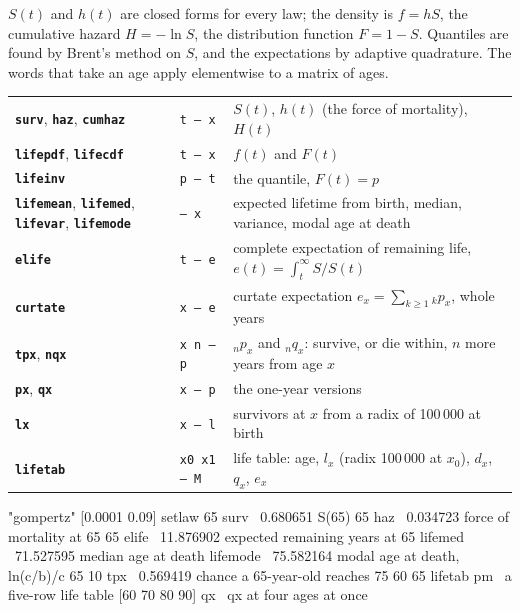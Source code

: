 \documentclass[11pt,letterpaper]{article}
\newcommand{\cmd}[1]{\texttt{\textbf{#1}}}
\newcommand{\stk}[1]{\texttt{#1}}
\begin{document}
$S(t)$ and $h(t)$ are closed forms for every law; the density is $f = hS$, the cumulative hazard $H = -\ln S$, the distribution function $F = 1 - S$. Quantiles are found by Brent's method on $S$, and the expectations by adaptive quadrature. The words that take an age apply elementwise to a matrix of ages.
\begin{center}\small
\begin{tabular}{@{}>{\raggedright\arraybackslash}p{}>{\raggedright\arraybackslash}p{}>{\raggedright\arraybackslash}p{}@{}}
\toprule
\cmd{surv}, \cmd{haz}, \cmd{cumhaz} & \stk{t -- x} & $S(t)$, $h(t)$ (the force of mortality), $H(t)$ \\
\cmd{lifepdf}, \cmd{lifecdf} & \stk{t -- x} & $f(t)$ and $F(t)$ \\
\cmd{lifeinv} & \stk{p -- t} & the quantile, $F(t) = p$ \\
\cmd{lifemean}, \cmd{lifemed}, \cmd{lifevar}, \cmd{lifemode} & \stk{-- x} & expected lifetime from birth, median, variance, modal age at death \\
\cmd{elife} & \stk{t -- e} & complete expectation of remaining life, $e(t) = \int_t^\infty S / S(t)$ \\
\cmd{curtate} & \stk{x -- e} & curtate expectation $e_x = \sum_{k\ge 1} {}_kp_x$, whole years \\
\cmd{tpx}, \cmd{nqx} & \stk{x n -- p} & ${}_np_x$ and ${}_nq_x$: survive, or die within, $n$ more years from age $x$ \\
\cmd{px}, \cmd{qx} & \stk{x -- p} & the one-year versions \\
\cmd{lx} & \stk{x -- l} & survivors at $x$ from a radix of 100\,000 at birth \\
\cmd{lifetab} & \stk{x0 x1 -- M} & life table: age, $l_x$ (radix 100\,000 at $x_0$), $d_x$, $q_x$, $e_x$ \\
\bottomrule
\end{tabular}
\end{center}
\begin{rpn}
"gompertz" [0.0001 0.09] setlaw
65 surv                     \ 0.680651   S(65)
65 haz                      \ 0.034723   force of mortality at 65
65 elife                    \ 11.876902  expected remaining years at 65
lifemed                     \ 71.527595  median age at death
lifemode                    \ 75.582164  modal age at death, ln(c/b)/c
65 10 tpx                   \ 0.569419   chance a 65-year-old reaches 75
60 65 lifetab pm            \ a five-row life table
[60 70 80 90] qx            \ qx at four ages at once
\end{rpn}
\end{document}
